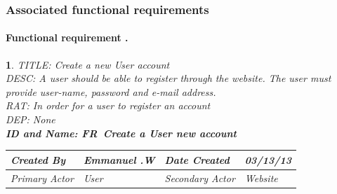 \documentclass{scrreprt}
\theoremstyle{funreq}
\newtheorem{funreq}{}
\begin{document}
	\subsubsection{Associated functional requirements}
	\paragraph[]{Functional requirement .}
	
	\begin{funreq}
		
		\label{account_create}
		TITLE: Create a new User account\\
		DESC: A user should be able to register through the website. The user must provide user-name, password and e-mail address. \\
		RAT: In order for a user to register an account\\
		DEP: None\\
		
		\bfseries{ID and Name: FR\thefunreq ~\hspace{.6cm}Create a User new account}
		\begin{table}[h!]
			\begin{tabularx}{\columnwidth}{|X|X|X|X|}
				\hline
				Created By    & Emmanuel .W & Date Created    & 03/13/13 \\ \hline
				Primary Actor & User        & Secondary Actor & Website \\ \hline
			\end{tabularx}
		

\end{table}
\end{funreq}
\end{document}
